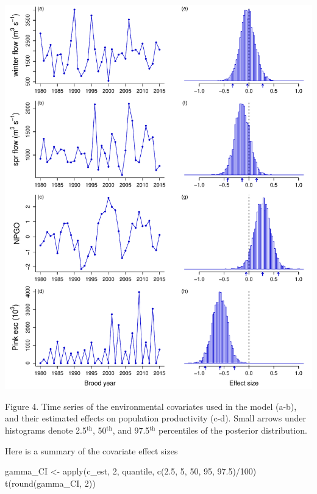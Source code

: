 \documentclass[11pt,]{article}
\newenvironment{Shaded}{}{}
\newcommand{\KeywordTok}[1]{\textcolor[rgb]{0.00,0.00,1.00}{#1}}
\newcommand{\DecValTok}[1]{#1}
\newcommand{\FloatTok}[1]{#1}
\newcommand{\StringTok}[1]{\textcolor[rgb]{0.00,0.50,0.50}{#1}}
\newcommand{\OperatorTok}[1]{#1}
\newcommand{\NormalTok}[1]{#1}
\begin{document}
\begin{center}\includegraphics{App_3_Summarize_results_files/figure-latex/fig_4_cov_effects-1} \end{center}

Figure 4. Time series of the environmental covariates used in the model
(a-b), and their estimated effects on population productivity (c-d).
Small arrows under histograms denote 2.5\(^\text{th}\),
50\(^\text{th}\), and 97.5\(^\text{th}\) percentiles of the posterior
distribution.

Here is a summary of the covariate effect sizes

\begin{Shaded}
\begin{Highlighting}[]
\NormalTok{gamma_CI <-}\StringTok{ }\KeywordTok{apply}\NormalTok{(c_est, }\DecValTok{2}\NormalTok{, quantile, }\KeywordTok{c}\NormalTok{(}\FloatTok{2.5}\NormalTok{, }\DecValTok{5}\NormalTok{, }\DecValTok{50}\NormalTok{, }\DecValTok{95}\NormalTok{, }\FloatTok{97.5}\NormalTok{)}\OperatorTok{/}\DecValTok{100}\NormalTok{)}
\KeywordTok{t}\NormalTok{(}\KeywordTok{round}\NormalTok{(gamma_CI, }\DecValTok{2}\NormalTok{))}
\end{Highlighting}
\end{Shaded}
\end{document}
